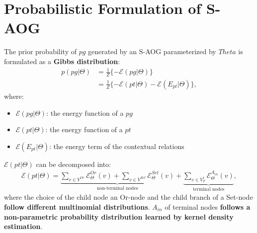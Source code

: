 \documentclass[10pt]{article}
\begin{document}
\section{Probabilistic Formulation of S-AOG}%
\label{sec:formulation}
The prior probability of $pg$ generated by an S-AOG parameterized by $Theta$ is
formulated as a \textbf{Gibbs distribution}:
%
\begin{align}
  p(pg \vert \Theta) &= \frac{1}{Z} \{-\mathcal{E}(pg \vert \Theta)\} \label{eq:1} \\
                     &= \frac{1}{Z} \{-\mathcal{E}(pt \vert \Theta) - \mathcal{E}(E_{pt} \vert \Theta)\}, \label{eq:2}
\end{align}
%
where:
%
\begin{itemize}
  \item $\mathcal{E}(pg \vert \Theta)$: the energy function of a $pg$
  \item $\mathcal{E}(pt \vert \Theta)$: the energy function of a $pt$
  \item $\mathcal{E}(E_{pt} \vert \Theta)$: the energy term of the contextual
    relations
\end{itemize}
%
$\mathcal{E}(pt \vert \Theta)$ can be decomposed into:
%
\begin{align}
  \label{eq:3}
  \mathcal{E}(pt \vert \Theta) = \underbrace{\sum_{v \in V^{Or}} \mathcal{E}^{Or}_{\Theta}(v) + \sum_{v \in V^{Set}} \mathcal{E}^{Set}_{\Theta}(v)}_{\text{non-terminal nodes}} + \underbrace{\sum_{v \in V^r_T} \mathcal{E}^{A_{in}}_{\Theta}(v)}_{\text{terminal nodes}},
\end{align}
%
where the choice of the child node an Or-node and the child branch of a
Set-node \textbf{follow different multinomial distributions}. $A_{in}$ of
terminal nodes \textbf{follows a non-parametric probability distribution
learned by kernel density estimation}.


% 
% 
\end{document}

